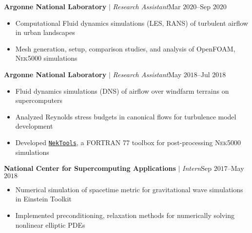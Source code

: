 \documentclass[10pt]{article}
\begin{document}
\begin{multicols}{2}
\vspace{0.5em}
%
\textbf{Argonne National Laboratory} $|$ \textit{Research Assistant}\hfill Mar $2020$--Sep $2020$

\vspace{-1.75em}
\begin{itemize}[label=-,leftmargin=1.0em]
    \setlength\itemsep{-0.25em}
    \item Computational Fluid dynamics simulations (LES, RANS) of turbulent airflow in urban landscapes
    \item Mesh generation, setup, comparison studies, and analysis of OpenFOAM, \textsc{Nek5000} simulations
\end{itemize}
\vspace{-2.0em}

\vspace{0.5em}
%
\textbf{Argonne National Laboratory} $|$ \textit{Research Assistant}\hfill May $2018$--Jul $2018$

\vspace{-1.75em}
\begin{itemize}[label=-,leftmargin=1.0em]
    \setlength\itemsep{-0.25em}
    \item Fluid dynamics simulations (DNS) of airflow over windfarm terrains on supercomputers
    \item Analyzed Reynolds stress budgets in canonical flows for turbulence model development
    \item Developed \href{https://github.com/vpuri3/NekTools}{\texttt{NekTools}}, a FORTRAN 77 toolbox for post-processing \textsc{Nek5000} simulations
\end{itemize}
\vspace{-2.0em}

\vspace{0.5em}
%
\textbf{National Center for Supercomputing Applications} $|$ \textit{Intern}\hfill Sep $2017$--May $2018$

\vspace{-1.75em}
\begin{itemize}[label=-,leftmargin=1.0em]
    \setlength\itemsep{-0.25em}
    \item Numerical simulation of spacetime metric for gravitational wave simulations in Einstein Toolkit
    \item Implemented preconditioning, relaxation methods for numerically solving nonlinear elliptic PDEs
\end{itemize}
\vspace{-2.0em}


\end{multicols}
\end{document}
